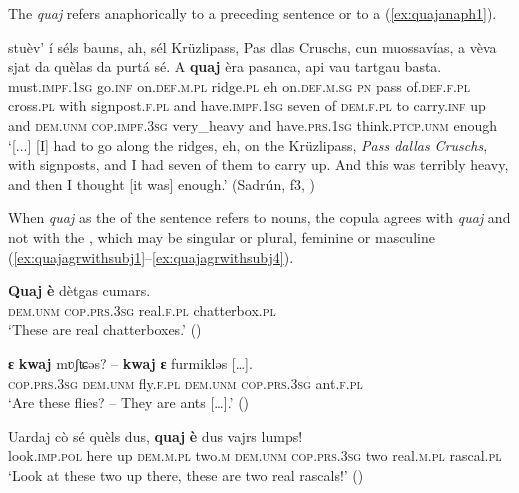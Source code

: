 The    \textit{quaj} refers anaphorically to a preceding sentence or  to a  (\ref{ex:quajanaph1}).

\ea
\label{ex:quajanaph1}
\gll [...] stuèv’ í  séls bauns, ah, sél Krüzlipass, Pas dlas Cruschs, cun muossavías, a vèva sjat da quèlas da purtá sé.  A \textbf{quaj} èra pasanca, api vau tartgau basta.  \\
{} must.\textsc{impf.1sg} go.\textsc{inf} on.\textsc{def.m.pl} ridge.\textsc{pl} eh on.\textsc{def.m.sg} \textsc{pn} pass of.\textsc{def.f.pl} cross.\textsc{pl} with signpost.\textsc{f.pl} and have.\textsc{impf.1sg} seven of  \textsc{dem.f.pl} to carry.\textsc{inf} up and \textsc{dem.unm} \textsc{cop.impf.3sg} very\_heavy and have.\textsc{prs.1sg} think.\textsc{ptcp.unm} enough \\
\glt `[...] [I] had to go along the ridges, eh, on the Krüzlipass, \textit{Pass dallas Cruschs}, with signposts, and I had seven of them to carry up. And this was terribly heavy, and then I thought [it was] enough.' (Sadrún, f3, )
\z

When \textit{quaj} as the  of the sentence refers  to nouns, the copula agrees with \textit{quaj} and not with the , which may be singular or plural, feminine or masculine (\ref{ex:quajagrwithsubj1}--\ref{ex:quajagrwithsubj4}).

\ea
\label{ex:quajagrwithsubj1}
\gll \textbf{Quaj} \textbf{è} dètgas cumars.\\
\textsc{dem.unm} \textsc{cop.prs.3sg} real.\textsc{f.pl} chatterbox.\textsc{pl}\\
\glt `These are real chatterboxes.' ()
\z

\ea
\label{ex:quajagrwithsubj2}
\gll \textbf{ɛ} \textbf{kwaj} mʋʃʨəs? – \textbf{kwaj} \textbf{ɛ} furmikləs […].\\
     \textsc{cop.prs.3sg} \textsc{dem.unm} fly.\textsc{f.pl} \textsc{}  \textsc{dem.unm} \textsc{cop.prs.3sg} ant.\textsc{f.pl}\\
\glt `Are these flies? – They are ants […].' (\citealt[28]{Gartner1910})
\z

\ea
\label{ex:quajagrwithsubj3}
\gll Uardaj cò sé quèls dus, \textbf{quaj} \textbf{è} dus vajrs lumps!\\
     look.\textsc{imp.pol} here up \textsc{dem.m.pl} two.\textsc{m} \textsc{dem.unm} \textsc{cop.prs.3sg} two real.\textsc{m.pl} rascal.\textsc{pl}  \\
\glt `Look at these two up there, these are two real rascals!' (\citealt[15]{Berther2007})
\z

